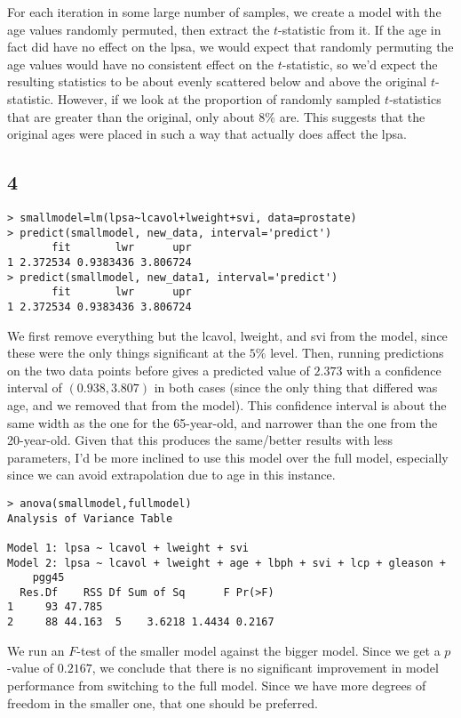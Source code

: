 \documentclass{article}
\begin{document}
For each iteration in some large number of samples, we create a model with the age values randomly permuted, then extract the $t$-statistic from it. If the age in fact did have no effect on the lpsa, we would expect that randomly permuting the age values would have no consistent effect on the $t$-statistic, so we'd expect the resulting statistics to be about evenly scattered below and above the original $t$-statistic. However, if we look at the proportion of randomly sampled $t$-statistics that are greater than the original, only about $8\%$ are. This suggests that the original ages were placed in such a way that actually does affect the lpsa.
\subsection*{4}
\begin{verbatim}
> smallmodel=lm(lpsa~lcavol+lweight+svi, data=prostate)
> predict(smallmodel, new_data, interval='predict')
       fit       lwr      upr
1 2.372534 0.9383436 3.806724
> predict(smallmodel, new_data1, interval='predict')
       fit       lwr      upr
1 2.372534 0.9383436 3.806724
\end{verbatim}

We first remove everything but the lcavol, lweight, and svi from the model, since these were the only things significant at the $5\%$ level. Then, running predictions on the two data points before gives a predicted value of $2.373$ with a confidence interval of $(0.938, 3.807)$ in both cases (since the only thing that differed was age, and we removed that from the model). This confidence interval is about the same width as the one for the 65-year-old, and narrower than the one from the 20-year-old. Given that this produces the same/better results with less parameters, I'd be more inclined to use this model over the full model, especially since we can avoid extrapolation due to age in this instance.
\begin{verbatim}
> anova(smallmodel,fullmodel)
Analysis of Variance Table

Model 1: lpsa ~ lcavol + lweight + svi
Model 2: lpsa ~ lcavol + lweight + age + lbph + svi + lcp + gleason + 
    pgg45
  Res.Df    RSS Df Sum of Sq      F Pr(>F)
1     93 47.785                           
2     88 44.163  5    3.6218 1.4434 0.2167
\end{verbatim}

We run an $F$-test of the smaller model against the bigger model. Since we get a $p$-value of $0.2167$, we conclude that there is no significant improvement in model performance from switching to the full model. Since we have more degrees of freedom in the smaller one, that one should be preferred.
\end{document}
